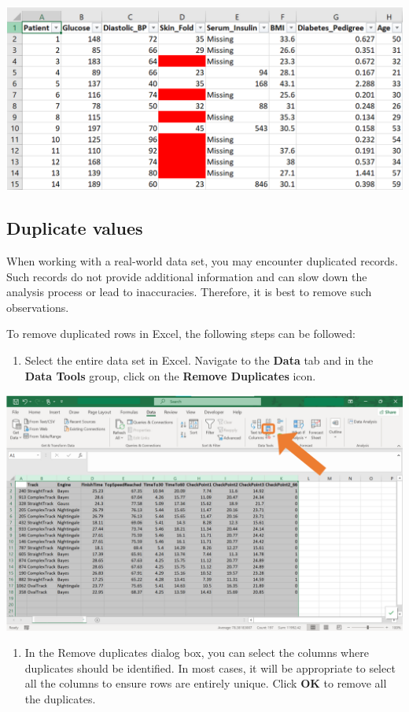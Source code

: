 \documentclass[
]{book}
\providecommand{\tightlist}{%
  \setlength{\itemsep}{0pt}\setlength{\parskip}{0pt}}
\begin{document}
\begin{center}\includegraphics[width=0.8\linewidth]{Figures/missing_3_3} \end{center}

\subsection{Duplicate values}\label{duplicate-values}

When working with a real-world data set, you may encounter duplicated records. Such records do not provide additional information and can slow down the analysis process or lead to inaccuracies. Therefore, it is best to remove such observations.

To remove duplicated rows in Excel, the following steps can be followed:

\begin{enumerate}
\def\labelenumi{\arabic{enumi}.}
\tightlist
\item
  Select the entire data set in Excel. Navigate to the \textbf{Data} tab and in the \textbf{Data Tools} group, click on the \textbf{Remove Duplicates} icon.
\end{enumerate}

\begin{center}\includegraphics[width=0.8\linewidth]{Figures/duplicated_1} \end{center}

\begin{enumerate}
\def\labelenumi{\arabic{enumi}.}
\setcounter{enumi}{1}
\tightlist
\item
  In the Remove duplicates dialog box, you can select the columns where duplicates should be identified. In most cases, it will be appropriate to select all the columns to ensure rows are entirely unique. Click \textbf{OK} to remove all the duplicates.
\end{enumerate}
\end{document}
